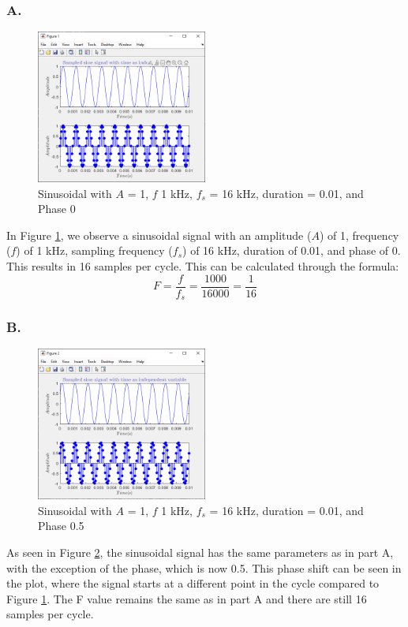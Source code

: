 \documentclass{article}
\begin{document}
\subsubsection*{A.}
\begin{figure}[H]
	\centering
	\includegraphics[width=0.5\textwidth]{fig 1a.png}
	\caption{Sinusoidal with $A$ = 1, $f$ 1 kHz, $f_s$ = 16 kHz, duration = 0.01, and Phase 0}
	\label{fig:fig1}
\end{figure}
In Figure \ref{fig:fig1}, we observe a sinusoidal signal with an amplitude ($A$) of 1, 
frequency ($f$) of 1 kHz, sampling frequency ($f_s$) of 16 kHz, duration of 0.01, 
and phase of 0. This results in 16 samples per cycle. This can be calculated through 
the formula:
\[ 
F = \frac{f}{f_s} = \frac{1000}{16000} = \frac{1}{16}
\]

\subsubsection*{B.}

\begin{figure}[H]
	\centering
	\includegraphics[width=0.5\textwidth]{fig 1b.png}
	\caption{Sinusoidal with $A$ = 1, $f$ 1 kHz, $f_s$ = 16 kHz, duration = 0.01, and Phase 0.5}
	\label{fig:fig2}
\end{figure}
As seen in Figure \ref{fig:fig2}, the sinusoidal signal has the same parameters as 
in part A, with the exception of the phase, which is now 0.5. This phase shift can be 
seen in the plot, where the signal starts at a different point in the cycle compared
to Figure \ref{fig:fig1}. The F value remains the same as in part A and there 
are still 16 samples per cycle.
\end{document}
